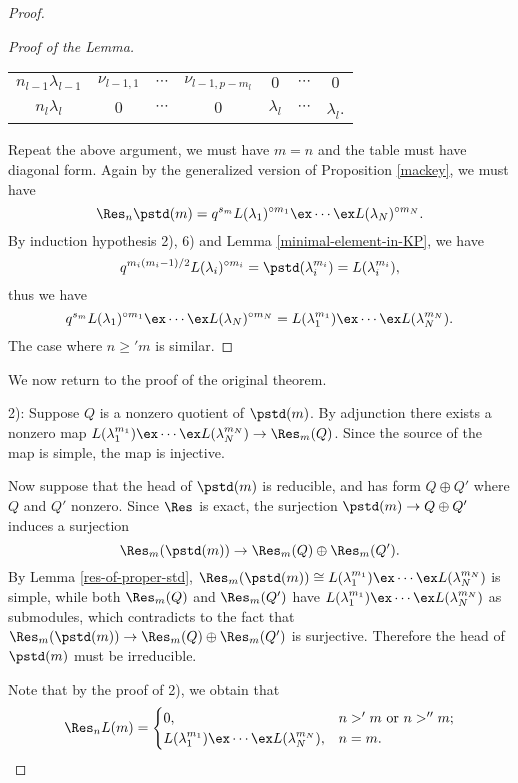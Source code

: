 \begin{proof}
\begin{proof}[Proof of the Lemma]
\begin{center}
\begin{tabular}{c|cccccc}
                $n_{l-1}\lambda_{l-1}$&$\nu_{l-1,1}$&$\cdots$&$\nu_{l-1,p-m_l}$
                &$0$&$\cdots$&$0$\\
                $n_l\lambda_l$&$0$&$\cdots$&$0$
                &$\lambda_l$&$\cdots$&$\lambda_l$.
            \end{tabular}
        \end{center}
        Repeat the above argument, we must have $m = n$ and the table must have
        diagonal form. Again by the generalized version of Proposition \ref{mackey},
        we must have 
        \[
            \Res_n\pstd(m) = q^{s_m}
            L(\lambda_1)^{\circ m_1}\ex\cdots\ex L(\lambda_N)^{\circ m_N}.
        \]    
        By induction hypothesis 2), 6) and Lemma \ref{minimal-element-in-KP},
        we have $$q^{m_i(m_i-1)/2}L(\lambda_i)^{\circ m_i}
         = \pstd(\lambda_i^{m_i}) = L(\lambda_i^{m_i}),$$ thus we have 
        \[
            q^{s_m}L(\lambda_1)^{\circ m_1}\ex\cdots\ex L(\lambda_N)^{\circ m_N}
            = L(\lambda_1^{m_1})\ex\cdots\ex L(\lambda_N^{m_N}).
        \]    
        The case where $n\ge'm$ is similar.
    \end{proof}

    We now return to the proof of the original theorem.

    2): Suppose $Q$ is a nonzero quotient of $\pstd(m)$. By adjunction
    there exists a nonzero map $L(\lambda_1^{m_1})\ex\cdots\ex L(\lambda_N^{m_N})
    \to\Res_m(Q)$. Since the source of the map is simple, the map is injective.

    Now suppose that the head of $\pstd(m)$ is reducible, and has form $Q\oplus Q'$
    where $Q$ and $Q'$ nonzero. Since $\Res$ is exact, the surjection 
    $\pstd(m)\to Q\oplus Q'$ induces a surjection 
    \[
        \Res_m(\pstd(m))\to\Res_m(Q)\oplus\Res_m(Q').
    \] 
    By Lemma \ref{res-of-proper-std},
    $\Res_m(\pstd(m))\cong L(\lambda_1^{m_1})\ex\cdots\ex L(\lambda_N^{m_N})$
    is simple, while both $\Res_m(Q)$ and $\Res_m(Q')$ have
    $L(\lambda_1^{m_1})\ex\cdots\ex L(\lambda_N^{m_N})$ as submodules, which
    contradicts to the fact that $\Res_m(\pstd(m))\to
    \Res_m(Q)\oplus\Res_m(Q')$ is surjective. Therefore the head of $\pstd(m)$
    must be irreducible.

    Note that by the proof of 2), we obtain that 
    \begin{equation}\label{res-of-simple}
        \Res_n L(m) = 
        \begin{cases}
            0,&n>'m\text{ or }n>''m;\\
            L(\lambda_1^{m_1})\ex\cdots\ex L(\lambda_N^{m_N}),&n = m.
        \end{cases}
    \end{equation}


\end{proof}
